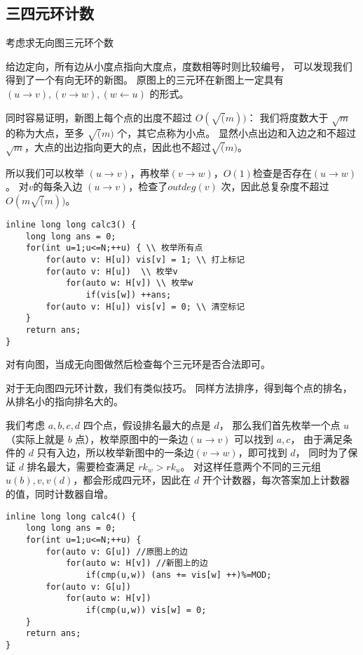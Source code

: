 \documentclass{ctexart}
\begin{document}
\subsection{三四元环计数}
考虑求无向图三元环个数

给边定向，所有边从小度点指向大度点，度数相等时则比较编号，
可以发现我们得到了一个有向无环的新图。
原图上的三元环在新图上一定具有 $(u \to v), (v \to w), (w \leftarrow u)$ 的形式。

同时容易证明，新图上每个点的出度不超过 $O(\sqrt(m))$：
我们将度数大于 $\sqrt m$ 的称为大点，至多 $\sqrt(m)$ 个，其它点称为小点。
显然小点出边和入边之和不超过 $\sqrt m$，大点的出边指向更大的点，因此也不超过$\sqrt(m)$。

所以我们可以枚举 $(u \to v)$，再枚举$(v \to w)$，$O(1)$检查是否存在$(u \to w)$。
对$v$的每条入边 $(u \to v)$，检查了$outdeg(v)$ 次，因此总复杂度不超过 $O(m\sqrt(m))$。

\begin{lstlisting}
inline long long calc3() {
    long long ans = 0;
    for(int u=1;u<=N;++u) { \\ 枚举所有点
        for(auto v: H[u]) vis[v] = 1; \\ 打上标记
        for(auto v: H[u])  \\ 枚举v
            for(auto w: H[v]) \\ 枚举w
                if(vis[w]) ++ans; 
        for(auto v: H[u]) vis[v] = 0; \\ 清空标记   
    }  
    return ans;
}
\end{lstlisting}

对有向图，当成无向图做然后检查每个三元环是否合法即可。

对于无向图四元环计数，我们有类似技巧。
同样方法排序，得到每个点的排名，从排名小的指向排名大的。

我们考虑 $a,b,c,d$ 四个点，假设排名最大的点是 $d$，
那么我们首先枚举一个点 $u$（实际上就是 $b$ 点），枚举原图中的一条边$(u \to v)$ 可以找到 $a, c$，
由于满足条件的 $d$ 只有入边，所以枚举新图中的一条边$(v \to w)$，即可找到 $d$，
同时为了保证 $d$ 排名最大，需要检查满足 $rk_w > rk_u$。
对这样任意两个不同的三元组 $u(b), v, v(d)$，都会形成四元环，因此在 $d$ 开个计数器，每次答案加上计数器的值，同时计数器自增。

\begin{lstlisting}
inline long long calc4() {
    long long ans = 0;
    for(int u=1;u<=N;++u) {
        for(auto v: G[u]) //原图上的边
            for(auto w: H[v]) //新图上的边
                if(cmp(u,w)) (ans += vis[w] ++)%=MOD;
        for(auto v: G[u])
            for(auto w: H[v])
                if(cmp(u,w)) vis[w] = 0;
    }
    return ans;
} 
\end{lstlisting}
\end{document}
